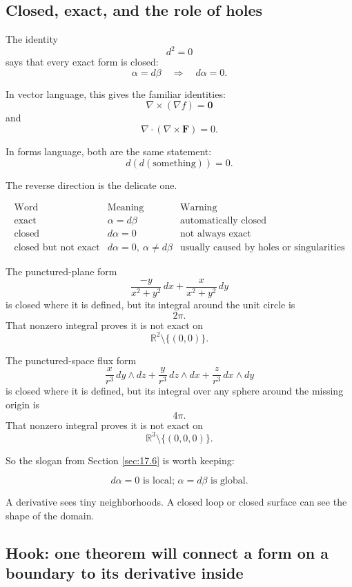 \subsection*{Closed, exact, and the role of holes}

The identity
\[
\boxed{
    d^2=0
}
\]
says that every exact form is closed:
\[
    \alpha=d\beta
    \quad\Longrightarrow\quad
    d\alpha=0.
\]

In vector language, this gives the familiar identities:
\[
\boxed{
    \nabla\times(\nabla f)=\mathbf 0
}
\]
and
\[
\boxed{
    \nabla\cdot(\nabla\times\mathbf F)=0.
}
\]

In forms language, both are the same statement:
\[
    d(d(\text{something}))=0.
\]

The reverse direction is the delicate one.

\[
\begin{array}{c|c|c}
\text{Word} & \text{Meaning} & \text{Warning} \\ \hline
\text{exact} & \alpha=d\beta & \text{automatically closed}\\[1mm]
\text{closed} & d\alpha=0 & \text{not always exact}\\[1mm]
\text{closed but not exact} & d\alpha=0,\ \alpha\ne d\beta
& \text{usually caused by holes or singularities}
\end{array}
\]

The punctured-plane form
\[
    \frac{-y}{x^2+y^2}\,dx
    +
    \frac{x}{x^2+y^2}\,dy
\]
is closed where it is defined, but its integral around the unit circle is
\[
    2\pi.
\]
That nonzero integral proves it is not exact on
\[
    \mathbb R^2\setminus\{(0,0)\}.
\]

The punctured-space flux form
\[
    \frac{x}{r^3}\,dy\wedge dz
    +
    \frac{y}{r^3}\,dz\wedge dx
    +
    \frac{z}{r^3}\,dx\wedge dy
\]
is closed where it is defined, but its integral over any sphere around the missing
origin is
\[
    4\pi.
\]
That nonzero integral proves it is not exact on
\[
    \mathbb R^3\setminus\{(0,0,0)\}.
\]

So the slogan from Section \ref{sec:17.6} is worth keeping:

\[
\boxed{
    d\alpha=0 \text{ is local; } \alpha=d\beta \text{ is global.}
}
\]

A derivative sees tiny neighborhoods.  A closed loop or closed surface can see the
shape of the domain.

\subsection{Hook: one theorem will connect a form on a boundary to its derivative inside}

